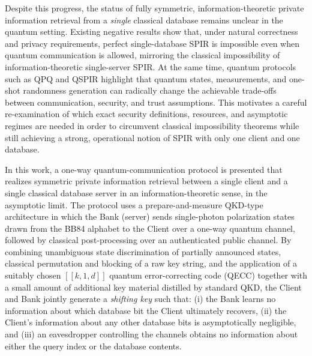 \documentclass[%
 reprint,
superscriptaddress,
 amsmath,amssymb,
 aps,
]{revtex4-2}
\begin{document}
Despite this progress, the status of fully symmetric, information-theoretic private information retrieval from a \emph{single} classical database remains unclear in the quantum setting. Existing negative results show that, under natural correctness and privacy requirements, perfect single-database SPIR is impossible even when quantum communication is allowed, mirroring the classical impossibility of information-theoretic single-server SPIR.%
At the same time, quantum protocols such as QPQ and QSPIR highlight that quantum states, measurements, and one-shot randomness generation can radically change the achievable trade-offs between communication, security, and trust assumptions.%
This motivates a careful re-examination of which exact security definitions, resources, and asymptotic regimes are needed in order to circumvent classical impossibility theorems while still achieving a strong, operational notion of SPIR with only one client and one database.%

In this work, a one-way quantum-communication protocol is presented that realizes symmetric private information retrieval between a single client and a single classical database server in an information-theoretic sense, in the asymptotic limit.%
The protocol uses a prepare-and-measure QKD-type architecture in which the Bank (server) sends single-photon polarization states drawn from the BB84 alphabet to the Client over a one-way quantum channel, followed by classical post-processing over an authenticated public channel.%
By combining unambiguous state discrimination of partially announced states, classical permutation and blocking of a raw key string, and the application of a suitably chosen $[[k,1,d]]$ quantum error-correcting code (QECC) together with a small amount of additional key material distilled by standard QKD, the Client and Bank jointly generate a \emph{shifting key} such that: (i) the Bank learns no information about which database bit the Client ultimately recovers, (ii) the Client’s information about any other database bits is asymptotically negligible, and (iii) an eavesdropper controlling the channels obtains no information about either the query index or the database contents.%
\end{document}
